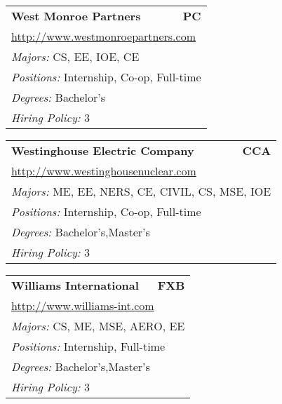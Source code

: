\documentclass[twoside]{article}
\begin{document}
\begin{center}
\begin{multicols}{3}
\begin{FlushLeft}
\begin{minipage}{.9\columnwidth}
\end{minipage}
 
\begin{minipage}{.9\columnwidth}\begin{tabularx}{.95\columnwidth}{Xr}
                 {\Large\bf West Monroe Partners} & {\Large\bf PC}\\
    \multicolumn{2}{p{.95\columnwidth}}{\url{http://www.westmonroepartners.com}}\\
    \multicolumn{2}{p{.95\columnwidth}}{\emph{Majors:} CS, EE, IOE, CE}\\
    \multicolumn{2}{p{.95\columnwidth}}{\emph{Positions:} Internship, Co-op, Full-time}\\
    \multicolumn{2}{p{.95\columnwidth}}{\emph{Degrees:} Bachelor's}\\
    \multicolumn{2}{p{.95\columnwidth}}{\emph{Hiring Policy:} 3}\\
    \end{tabularx}
    
\end{minipage}
 
\begin{minipage}{.9\columnwidth}\begin{tabularx}{.95\columnwidth}{Xr}
                 {\Large\bf Westinghouse Electric Company} & {\Large\bf CCA}\\
    \multicolumn{2}{p{.95\columnwidth}}{\url{http://www.westinghousenuclear.com}}\\
    \multicolumn{2}{p{.95\columnwidth}}{\emph{Majors:} ME, EE, NERS, CE, CIVIL, CS, MSE, IOE}\\
    \multicolumn{2}{p{.95\columnwidth}}{\emph{Positions:} Internship, Co-op, Full-time}\\
    \multicolumn{2}{p{.95\columnwidth}}{\emph{Degrees:} Bachelor's,Master's}\\
    \multicolumn{2}{p{.95\columnwidth}}{\emph{Hiring Policy:} 3}\\
    \end{tabularx}
    
\end{minipage}
 
\begin{minipage}{.9\columnwidth}\begin{tabularx}{.95\columnwidth}{Xr}
                 {\Large\bf Williams International} & {\Large\bf FXB}\\
    \multicolumn{2}{p{.95\columnwidth}}{\url{http://www.williams-int.com}}\\
    \multicolumn{2}{p{.95\columnwidth}}{\emph{Majors:} CS, ME, MSE, AERO, EE}\\
    \multicolumn{2}{p{.95\columnwidth}}{\emph{Positions:} Internship, Full-time}\\
    \multicolumn{2}{p{.95\columnwidth}}{\emph{Degrees:} Bachelor's,Master's}\\
    \multicolumn{2}{p{.95\columnwidth}}{\emph{Hiring Policy:} 3}\\
    \end{tabularx}
    

\end{minipage}
\end{FlushLeft}
\end{multicols}
\end{center}
\end{document}
